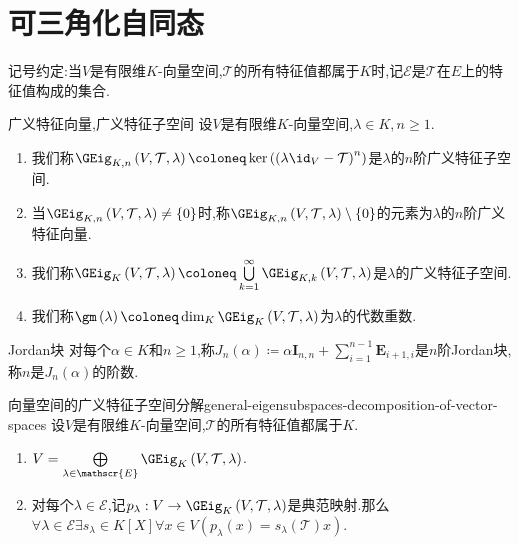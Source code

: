 \section{可三角化自同态}

记号约定:当$V$是有限维$K$-向量空间,$\mathcal{T}$的所有特征值都属于$K$时,记$\mathscr{E}$是$\mathcal{T}$在$E$上的特征值构成的集合.

\begin{definition}{广义特征向量,广义特征子空间}{}
	设$V$是有限维$K$-向量空间,$\lambda\in K,n\geq 1$.
	\begin{enumerate}
		\item 我们称$\GEig_{K,n}\left(V,\mathcal{T},\lambda\right)\coloneq\ker\left(\left(\lambda\id_{V}-\mathcal{T}\right)^{n}\right)$是$\lambda$的$n$阶广义特征子空间.
		\item 当$\GEig_{K,n}\left(V,\mathcal{T},\lambda\right)\neq\left\{0\right\}$时,称$\GEig_{K,n}\left(V,\mathcal{T},\lambda\right)\setminus\left\{0\right\}$的元素为$\lambda$的$n$阶广义特征向量.
		\item 我们称$\GEig_{K}\left(V,\mathcal{T},\lambda\right)\coloneq\bigcup\limits_{k=1}^{\infty}\GEig_{K,k}\left(V,\mathcal{T},\lambda\right)$是$\lambda$的广义特征子空间.
		\item 我们称$\gm\left(\lambda\right)\coloneq\dim_{K}\GEig_{K}\left(V,\mathcal{T},\lambda\right)$为$\lambda$的代数重数.
	\end{enumerate}
\end{definition}

\begin{definition}{Jordan块}{}
	对每个$\alpha\in K$和$n\geq 1$,称$J_{n}\left(\alpha\right)\coloneq\alpha\boldsymbol{I}_{n,n}+\sum\limits_{i=1}^{n-1}\boldsymbol{E}_{i+1,i}$是$n$阶Jordan块,称$n$是$J_{n}\left(\alpha\right)$的阶数.
\end{definition}

\begin{proposition}{向量空间的广义特征子空间分解}{general-eigensubspaces-decomposition-of-vector-spaces}
	设$V$是有限维$K$-向量空间,$\mathcal{T}$的所有特征值都属于$K$.
	\begin{enumerate}
		\item $V=\bigoplus\limits_{\lambda\in\mathscr{E}}\GEig_{K}\left(V,\mathcal{T},\lambda\right)$.
		\item 对每个$\lambda\in\mathscr{E}$,记$p_{\lambda}:V\to\GEig_{K}\left(V,\mathcal{T},\lambda\right)$是典范映射.那么$\forall\lambda\in\mathscr{E}\exists s_{\lambda}\in K[X]\forall x\in V\left(p_{\lambda}\left(x\right)=s_{\lambda}\left(\mathcal{T}\right)x\right)$.
	\end{enumerate}
\end{proposition}

